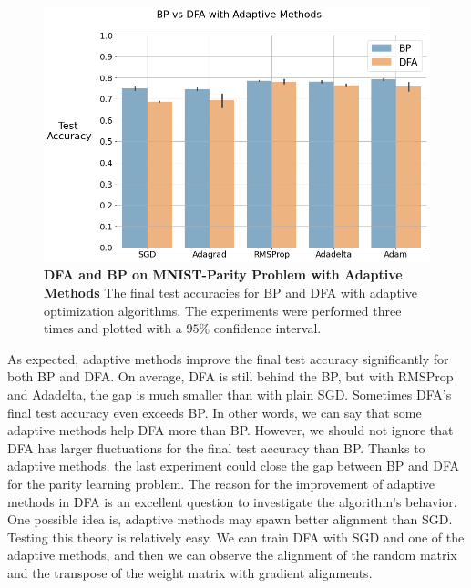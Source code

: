 \documentclass[a4paper, nobind]{templates/ociamthesis}
\begin{document}
\begin{figure}

{\centering \includegraphics[width=1\linewidth]{figures/3_mainExperiment} 

}

\caption[DFA and BP on MNIST-Parity Problem with Adaptive Methods]{\textbf{DFA and BP on MNIST-Parity Problem with Adaptive Methods} \newline The final test accuracies for BP and DFA with adaptive optimization algorithms. The experiments were performed three times and plotted with a $95\%$ confidence interval.}\label{fig:mainExperiment}
\end{figure}

\noindent As expected, adaptive methods improve the final test accuracy significantly for both BP and DFA. On average, DFA is still behind the BP, but with RMSProp and Adadelta, the gap is much smaller than with plain SGD. Sometimes DFA's final test accuracy even exceeds BP. In other words, we can say that some adaptive methods help DFA more than BP. However, we should not ignore that DFA has larger fluctuations for the final test accuracy than BP. Thanks to adaptive methods, the last experiment could close the gap between BP and DFA for the parity learning problem.
\noindent The reason for the improvement of adaptive methods in DFA is an excellent question to investigate the algorithm's behavior. One possible idea is, adaptive methods may spawn better alignment than SGD. Testing this theory is relatively easy. We can train DFA with SGD and one of the adaptive methods, and then we can observe the alignment of the random matrix and the transpose of the weight matrix with gradient alignments.
\end{document}
